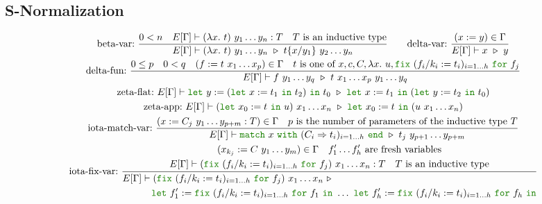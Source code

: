 \documentclass[a4paper,fleqn]{article}
\newcommand{\kwlet}{\mbox{\color{mygreen}\ttfamily let}}
\newcommand{\kwin}{\mbox{\color{mygreen}\ttfamily in}}
\newcommand{\kwmatch}{\mbox{\color{mygreen}\ttfamily match}}
\newcommand{\kwwith}{\mbox{\color{mygreen}\ttfamily with}}
\newcommand{\kwend}{\mbox{\color{mygreen}\ttfamily end}}
\newcommand{\kwfix}{\mbox{\color{mygreen}\ttfamily fix}}
\newcommand{\kwfor}{\mbox{\color{mygreen}\ttfamily for}}
\newcommand{\lam}[2]{\lambda #1.~#2}
\newcommand{\letin}[3]{\kwlet~#1:=#2~\kwin~#3}
\newcommand{\letinB}[2]{\kwlet~#1:=#2~\kwin}
\newcommand{\match}[4]{\kwmatch~#1~\kwwith~(#2 \Rightarrow #3)_{#4}~\kwend}
\newcommand{\fix}[4]{\kwfix~(#1 := #2)_{#3}~\kwfor~#4}
\newcommand{\subst}[3]{#1\{#2/#3\}}
\begin{document}
\subsection{S-Normalization}\label{sec:s-normalization}
\begin{gather*}
  \text{beta-var:}~
    \dfrac{
      0 < n \quad
      E[\Gamma] \vdash (\lam{x}{t})~y_1\dots y_n : T \quad
      \text{$T$ is an inductive type}
    }{
      E[\Gamma] \vdash (\lam{x}{t})~y_1\dots y_n~\triangleright~\subst{t}{x}{y_1}~y_2\dots y_n
    } \qquad
  \text{delta-var:}~
    \dfrac{(x:=y) \in \Gamma}{E[\Gamma] \vdash x~\triangleright~y} \\
  \text{delta-fun:}~
     \dfrac
     {
       0 \leq p \quad
       0 < q \quad
       (f := t~x_1\ldots x_p) \in \Gamma \quad
       \text{$t$ is one of $x, c, C, \lam{x}{u}, \fix{f_i/k_i}{t_i}{i=1\dots h}{f_j}$}
     }{
       E[\Gamma] \vdash f~y_1\ldots y_q
                        ~\triangleright~
                        t~x_1\ldots x_p~y_1\dots y_q
     } \\
  \text{zeta-flat:}~
    E[\Gamma] \vdash \letin{y}{(\letin{x}{t_1}{t_2})}{t_0}
                       ~\triangleright~
                       \letin{x}{t_1}{(\letin{y}{t_2}{t_0})} \\
  \text{zeta-app:}~
    E[\Gamma] \vdash
     (\letin{x_0}{t}{u})~x_1\ldots x_n
     ~\triangleright~
     \letin{x_0}{t}{(u~x_1\ldots x_n)} \\
  \text{iota-match-var:}~
    \dfrac
    {
      (x:=C_j~y_1\ldots y_{p+m}:T) \in \Gamma \quad
      \text{$p$ is the number of parameters of the inductive type $T$}
    }{
      E[\Gamma] \vdash
      \match{x}{C_i}{t_i}{i=1\dots h}
      ~\triangleright~
      t_j~y_{p+1}\ldots y_{p+m}
    } \\
  \text{iota-fix-var:}~
    \dfrac
    {
      \begin{gathered}
        (x_{k_j} := C~y_1\ldots y_m) \in \Gamma \quad
        \text{$f'_1\dots f'_h$ are fresh variables} \\
        E[\Gamma] \vdash (\fix{f_i/k_i}{t_i}{i=1\dots h}{f_j})~x_1\ldots x_n : T \quad
        \text{$T$ is an inductive type}
      \end{gathered}
    }{
      \begin{aligned}
        E[\Gamma] &\vdash (\fix{f_i/k_i}{t_i}{i=1\dots h}{f_j})~x_1\ldots x_n ~\triangleright~ \\
                  &\quad \letinB{f'_1}{\fix{f_i/k_i}{t_i}{i=1\dots h}{f_1}}
                         ~\dots~
                         \letinB{f'_h}{\fix{f_i/k_i}{t_i}{i=1\dots h}{f_h}} \\

\end{aligned}}
\end{gather*}
\end{document}
